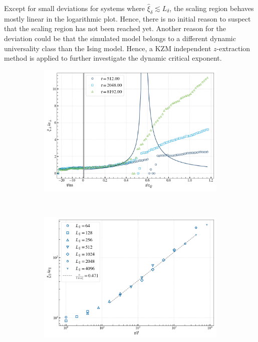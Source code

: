 	Except for small deviations for systems where $\hat{\xi}_\delta \lesssim L_\delta$, the scaling region behaves mostly linear in the logarithmic plot. Hence, there is no initial reason to suspect that the scaling region has not been reached yet. Another reason for the deviation could be that the simulated model belongs to a different dynamic universality class than the Ising model. Hence, a KZM independent $z$-extraction method is applied to further investigate the dynamic critical exponent.	
	\begin{figure}
		\begin{subfigure}{0.475\textwidth}
			\centering
			
		\end{subfigure}
		\begin{subfigure}{0.475\textwidth}
			\centering
			\includegraphics[width=0.95\linewidth]{graphics/quench-process-perp.png}
		\end{subfigure} \\ \par\bigskip
		\begin{subfigure}{0.475\textwidth}
			\centering
			\includegraphics[width=0.95\linewidth]{graphics/tau-xi-parallel3.png}

\end{subfigure}
\end{figure}
